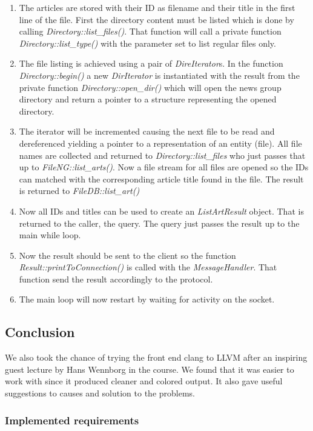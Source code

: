 \documentclass[10pt, a4paper]{article}
\begin{document}
\begin{enumerate}
	\item The articles are stored with their ID as filename and their title in the first line of the file. First the directory content must be listed which is done by calling \emph{Directory::list\_files()}. That function will call a private function \emph{Directory::list\_type()} with the parameter set to list regular files only.
	\item The file listing is achieved using a pair of \emph{DireIterator}s. In the function \emph{Directory::begin()} a new \emph{DirIterator} is instantiated with the result from the private function \emph{Directory::open\_dir()} which will open the news group directory and return a pointer to a structure representing the opened directory.
	\item The iterator will be incremented causing the next file to be read and dereferenced yielding a pointer to a representation of an entity (file). All file names are collected and returned to \emph{Directory::list\_files} who just passes that up to \emph{FileNG::list\_arts()}. Now a file stream for all files are opened so the IDs can matched with the corresponding article title found in the file. The result is returned to \emph{FileDB::list\_art()}
	\item Now all IDs and  titles can be used to create an \emph{ListArtResult} object.  That is returned to the caller, the query. The query just passes the result up to the main while loop.
	\item Now the result should be sent to the client so the function \emph{Result::printToConnection()} is called with the \emph{MessageHandler}. That function send the result accordingly to the protocol.
	\item The main loop will now restart by waiting for activity on the socket.
	
\end{enumerate}

\subsection{Conclusion}


We also took the chance of trying the front end clang to LLVM after an inspiring guest lecture by Hans Wennborg in the course. We found that it was easier to work with since it produced cleaner and colored output. It also gave useful suggestions to causes and solution to the problems.

\subsubsection{Implemented requirements}
\end{document}
